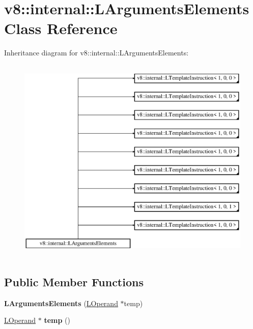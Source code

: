 \hypertarget{classv8_1_1internal_1_1_l_arguments_elements}{}\section{v8\+:\+:internal\+:\+:L\+Arguments\+Elements Class Reference}
\label{classv8_1_1internal_1_1_l_arguments_elements}
Inheritance diagram for v8\+:\+:internal\+:\+:L\+Arguments\+Elements\+:\begin{figure}[H]
\begin{center}
\leavevmode
\includegraphics[height=10.000000cm]{classv8_1_1internal_1_1_l_arguments_elements}
\end{center}
\end{figure}
\subsection*{Public Member Functions}
\begin{DoxyCompactItemize}
\item 
{\bfseries L\+Arguments\+Elements} (\hyperlink{classv8_1_1internal_1_1_l_operand}{L\+Operand} $\ast$temp)\hypertarget{classv8_1_1internal_1_1_l_arguments_elements_ac05e5d752e17f134ea5726a5fda6f03c}{}\label{classv8_1_1internal_1_1_l_arguments_elements_ac05e5d752e17f134ea5726a5fda6f03c}

\item 
\hyperlink{classv8_1_1internal_1_1_l_operand}{L\+Operand} $\ast$ {\bfseries temp} ()\hypertarget{classv8_1_1internal_1_1_l_arguments_elements_a98115086fb4574409af1de886200ab2b}{}\label{classv8_1_1internal_1_1_l_arguments_elements_a98115086fb4574409af1de886200ab2b}

\end{DoxyCompactItemize}
